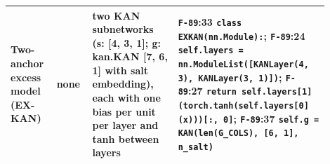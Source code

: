 {\begin{longtable}{R{0.13\linewidth} R{0.10\linewidth} R{0.25\linewidth} R{0.42\linewidth}}
Two-anchor excess model (EX-KAN) & none & two KAN subnetworks (s: [4, 3, 1]; g: kan.KAN [7, 6, 1] with salt embedding), each with one bias per unit per layer and tanh between layers & \texttt{F-89}:33 \texttt{class EXKAN(\allowbreak{}nn.Module):}; \texttt{F-89}:24 \texttt{self.layers = nn.ModuleList(\allowbreak{}[KANLayer(\allowbreak{}4, \allowbreak{}3), \allowbreak{}KANLayer(\allowbreak{}3, \allowbreak{}1)])}; \texttt{F-89}:27 \texttt{return self.layers[1](\allowbreak{}torch.tanh(\allowbreak{}self.layers[0](\allowbreak{}x)))[:, \allowbreak{}0]}; \texttt{F-89}:37 \texttt{self.g = KAN(\allowbreak{}len(\allowbreak{}G\_COLS), \allowbreak{}[6, \allowbreak{}1], \allowbreak{}n\_salt)} \\
\bottomrule
\end{longtable}}